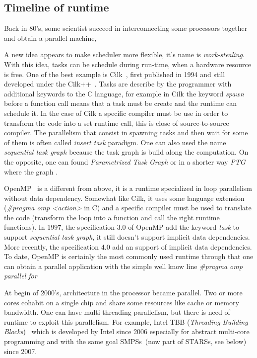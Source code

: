 \subsection{Timeline of runtime}
Back in 80's, some scientist succeed in interconnecting some processors together and obtain a parallel machine,

A new idea appears to make scheduler more flexible, it's name is {\em work-stealing}.
%
With this idea, tasks can be schedule during run-time, when a hardware resource is free.
%
One of the best example is Cilk~\cite{Cilk}, first published in 1994 and still developed under the Cilk++~\cite{Cilk++}.
%
Tasks are describe by the programmer with additional keywords to the C language, for example in Cilk the keyword {\em spawn} before a function call means that a task must be create and the runtime can schedule it.
%
In the case of Cilk a specific compiler must be use in order to transform the code into a set runtime call, this is close of source-to-source compiler.
%
The parallelism that consist in spawning tasks and then wait for some of them is often called {\em insert task} paradigm.
%
One can also used the name {\em sequential task graph} because the task graph is build along the computation.
%
On the opposite, one can found {\em Parametrized Task Graph} or in a shorter way {\em PTG} where the graph .

OpenMP~\cite{OpenMP} is a different from above, it is a runtime specialized in loop parallelism without data dependency.
%
Somewhat like Cilk, it uses some language extension ({\em \#pragma omp <action>} in C) and a specific compiler must be used to translate the code (transform the loop into a function and call the right runtime functions).
%
In 1997, the specification 3.0 of OpenMP add the keyword {\em task} to support {\em sequential task graph}, it still doesn't support implicit data dependencies.
%
More recently, the specification 4.0 add an support of implicit data dependencies.
%
To date, OpenMP is certainly the most commonly used runtime through that one can obtain a parallel application with the simple well know line {\em \#pragma omp parallel for}


At begin of 2000's, architecture in the processor became parallel.
%
Two or more cores cohabit on a single chip and share some resources like cache or memory bandwidth.
%
One can have multi threading parallelism, but there is need of runtime to exploit this parallelism.
%
For example, Intel TBB (\textit{Threading Building Blocks})~\cite{TBB} which is developed by Intel since 2006 especially for abstract multi-core programming and with the same goal SMPSs~\cite{SMPSs}(now part of STARSs, see below) since 2007.

